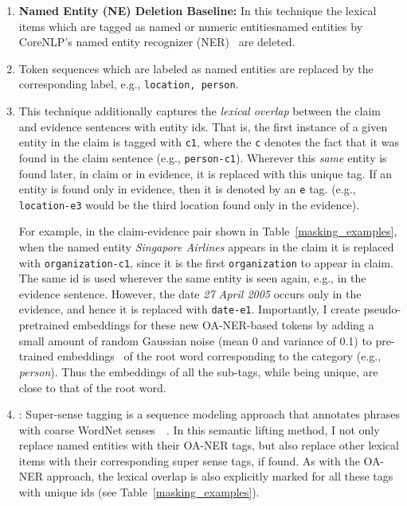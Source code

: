 \documentclass{article}
\begin{document}
\begin{enumerate}
\item \textbf{Named Entity (NE) Deletion Baseline:}
In this technique the lexical items which are tagged as named or numeric entitiesnamed entities by CoreNLP's named entity recognizer (NER)~\citep*{manning2014stanford} are deleted.  

\item {}  Token sequences which are labeled as named entities are replaced by the corresponding label, e.g., \texttt{location, person}.

\item {} This technique additionally captures the \textit{lexical overlap} between the claim and evidence sentences with entity ids.  
That is, the first instance of a given entity in the claim is tagged with \texttt{c1}, where the \texttt{c} denotes the fact that it was found in the claim sentence (e.g., \texttt{person-c1}). Wherever this {\em same} entity is found later, in claim or in evidence, it is replaced with this unique tag. If an entity is found only in evidence, then it is denoted by an \texttt{e} tag. (e.g., \texttt{location-e3} would be the third location found only in the evidence).

For example, in the claim-evidence pair shown in Table~\ref{masking_examples}, when the named entity \textit{Singapore Airlines} appears in the claim it is replaced with \texttt{organization-c1}, since it is the first \texttt{organization} to appear in claim. 
The same id is used wherever the same entity is seen again, e.g., in the evidence sentence. However, the date \textit{27 April 2005} occurs only in the evidence, and hence it is replaced with \texttt{date-e1}.
Importantly, I create pseudo-pretrained embeddings for these new OA-NER-based tokens by adding a small amount of random Gaussian noise (mean 0 and variance of 0.1) to pre-trained embeddings~\citep*{pennington2014glove} of the root word corresponding to the category (e.g., \textit{person}). Thus the embeddings of all the sub-tags, while being unique, are close to that of the root word.
\item {}:
Super-sense tagging is a sequence modeling approach that annotates phrases with coarse WordNet senses~\citep*{ciaramita2003supersense}~\citep*{miller1990introduction}. In this semantic lifting method, I not only replace named entities with their OA-NER tags, but also replace other lexical items with their corresponding super sense tags, if found. As with the OA-NER approach, the lexical overlap is also explicitly marked for all these tags with unique ids (see Table~\ref{masking_examples}). 
\end{enumerate}
\end{document}
